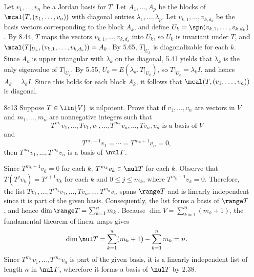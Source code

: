 \begin{sol}
    Let $v_1, \ldots, v_n$ be a Jordan basis for $T$.
    Let $A_1, \ldots, A_p$ be the blocks of $\mcal(T, (v_1, \ldots, v_n))$ with diagonal entries $\lambda_1, \ldots, \lambda_p$.
    Let $v_{k, 1}, \ldots, v_{k, d_k}$ be the basis vectors corresponding to the block $A_k$, and define $U_k = \spn(v_{k, 1}, \ldots, v_{k, d_k})$.
    By 8.44, $T$ maps the vectors $v_{k, 1}, \ldots, v_{k, d_k}$ into $U_k$, so $U_k$ is invariant under $T$, and $\mcal(T|_{U_k}, (v_{k, 1}, \ldots, v_{k, d_k})) = A_k$.
    By 5.65, $T|_{U_k}$ is diagonalizable for each $k$.
    Since $A_k$ is upper triangular with $\lambda_k$ on the diagonal, 5.41 yields that $\lambda_k$ is the only eigenvalue of $T|_{U_k}$.
    By 5.55, $U_k = E(\lambda_k, T|_{U_k})$, so $T|_{U_k} = \lambda_k I$, and hence $A_k = \lambda_k I$.
    Since this holds for each block $A_k$, it follows that $\mcal(T, (v_1, \ldots, v_n))$ is diagonal.
\end{sol}

\begin{exercise}{8c13}
    Suppose $T \in \lin{V}$ is nilpotent.
    Prove that if $v_1, \ldots, v_n$ are vectors in $V$ and $m_1, \ldots, m_n$ are nonnegative integers such that
    \[
        T^{m_1} v_1, \ldots, Tv_1, v_1, \ldots, T^{m_n} v_n, \ldots, Tv_n, v_n \text{ is a basis of } V
    \]
    and
    \[
        T^{m_1 + 1} v_1 = \cdots = T^{m_n + 1} v_n = 0,
    \]
    then $T^{m_1} v_1, \ldots, T^{m_n} v_n$ is a basis of $\nul T$.

\end{exercise}

\begin{sol}
    Since $T^{m_k+1} v_k = 0$ for each $k$, $T^{m_k} v_k \in \nul T$ for each $k$.
    Observe that $T(T^j v_k) = T^{j+1} v_k$ for each $k$ and $0 \leq j \leq m_k$, where $T^{m_k+1} v_k = 0$.
    Therefore, the list $T v_1, \ldots, T^{m_1} v_1, \ldots, T v_n, \ldots, T^{m_n} v_n$ spans $\range T$ and is linearly independent since it is part of the given basis.
    Consequently, the list forms a basis of $\range T$, and hence $\dim \range T = \sum_{k=1}^n m_k$.
    Because $\dim V = \sum_{k=1}^n (m_k + 1)$, the fundamental theorem of linear maps gives
    \[
        \dim \nul T = \sum_{k=1}^n (m_k + 1) - \sum_{k=1}^n m_k = n.
    \]
    Since $T^{m_1} v_1, \ldots, T^{m_n} v_n$ is part of the given basis, it is a linearly independent list of length $n$ in $\nul T$, wherefore it forms a basis of $\nul T$ by 2.38.
\end{sol}

